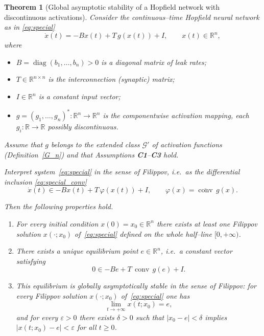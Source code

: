 \documentclass[journal]{IEEEtran}
\theoremstyle{myplain}
\newtheorem{theorem}{Theorem}
\begin{document}
\begin{theorem}[Global asymptotic stability of a Hopfield network with discontinuous activations]\label{thm:main}
Consider the continuous–time Hopfield neural network as in \eqref{eq:special}
\begin{equation*}
  \dot x(t) = -B x(t) + T\,g(x(t)) + I, \qquad x(t)\in\mathbb{R}^n,
\end{equation*}
where
\begin{itemize}
  \item $B = \operatorname{diag}(b_1,\dots,b_n)> 0$ is a diagonal matrix
        of leak rates;
  \item $T\in\mathbb{R}^{n\times n}$ is the interconnection (synaptic) matrix;
  \item $I\in\mathbb{R}^n$ is a constant input vector;
  \item $g=(g_1,\dots,g_n)^{*}:\mathbb{R}^n\to\mathbb{R}^n$ is the
        componentwise activation mapping, each
        $g_i:\mathbb{R}\to\mathbb{R}$ possibly discontinuous.
\end{itemize}
Assume that $g$ belongs to the extended class $\mathcal{G}'$ of
activation functions (Definition~\ref{G_n}) and that Assumptions
\textbf{C1}–\textbf{C3} hold.

Interpret system~\eqref{eq:special} in the sense of Filippov, i.e.\
as the differential inclusion \eqref{eq:special_conv}
\begin{equation*}
   \dot x(t) \in -B x(t) + T\,\varphi(x(t)) + I,
   \qquad \varphi(x) = \overline{\operatorname{conv}}\,g(x).
\end{equation*}

Then the following properties hold.
\begin{enumerate}
  \item For every initial condition $x(0)=x_0\in\mathbb{R}^n$ there
        exists at least one Filippov solution $x(\cdot;x_0)$
        of~\eqref{eq:special} defined on the whole half–line
        $[0,+\infty)$.

  \item There exists a unique equilibrium point $e\in\mathbb{R}^n$,
        i.e.\ a constant vector satisfying
        \[
           0 \in -B e + T\,\operatorname{conv}\,g(e) + I .
        \]

  \item This equilibrium is \emph{globally asymptotically stable in
        the sense of Filippov}: for every Filippov solution
        $x(\cdot;x_0)$ of~\eqref{eq:special} one has
        \[
           \lim_{t\to+\infty} x(t;x_0) = e ,
        \]
        and for every $\varepsilon>0$ there exists $\delta>0$ such
        that $|x_0-e|<\delta$ implies $|x(t;x_0)-e|<\varepsilon$ for
        all $t\ge0$.
\end{enumerate}
\end{theorem}
\end{document}
